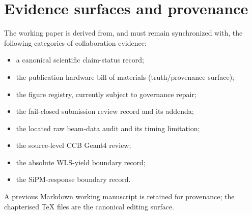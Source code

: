 \section{Evidence surfaces and provenance}

The working paper is derived from, and must remain synchronized with, the following categories of collaboration evidence:
\begingroup\sloppy
\begin{itemize}
  \item a canonical scientific claim-status record;
  \item the publication hardware bill of materials (truth/provenance surface);
  \item the figure registry, currently subject to governance repair;
  \item the fail-closed submission review record and its addenda;
  \item the located raw beam-data audit and its timing limitation;
  \item the source-level CCB Geant4 review;
  \item the absolute WLS-yield boundary record;
  \item the SiPM-response boundary record.
\end{itemize}
\endgroup

A previous Markdown working manuscript is retained for provenance; the chapterised TeX files are the canonical editing surface.
